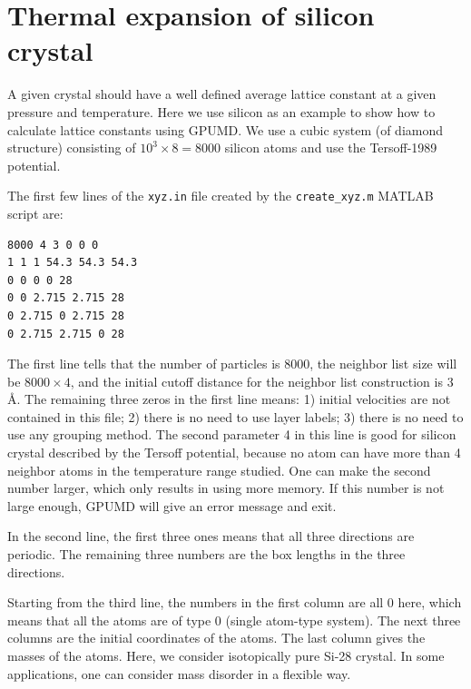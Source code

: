 \documentclass[12pt,a4paper]{report}
\begin{document}
\section{Thermal expansion of silicon crystal}


A given crystal should have a well defined average lattice constant at a given pressure and temperature. Here we use silicon as an example to show how to calculate lattice constants using GPUMD. We use a cubic system (of diamond structure) consisting of $10^3\times 8 = 8000$ silicon atoms and use the Tersoff-1989 potential.

The first few lines of the \verb"xyz.in" file created by the \verb"create_xyz.m" MATLAB script are:
\begin{verbatim}
8000 4 3 0 0 0
1 1 1 54.3 54.3 54.3
0 0 0 0 28
0 0 2.715 2.715 28
0 2.715 0 2.715 28
0 2.715 2.715 0 28
\end{verbatim}
The first line tells that the number of particles is 8000, the neighbor list size will be
$8000\times 4$, and the initial cutoff distance for the neighbor list construction is 3 \AA. The remaining three zeros in the first line means: 1) initial velocities are not contained in this file; 2) there is no need to use layer labels; 3) there is no need to use any grouping method. The second parameter 4 in this line is good for silicon crystal described by the Tersoff potential, because no atom can have more than 4 neighbor atoms in the temperature range studied. One can make the second number larger, which only results in using more memory. If this number is not large enough, GPUMD will give an error message and exit. 

In the second line, the first three ones means that all three directions are periodic. The remaining three numbers are the box lengths in the three directions. 

Starting from the third line, the numbers in the first column are all 0 here, which means that all the atoms are of type 0 (single atom-type system). The next three columns are the initial coordinates of the atoms. The last column gives the masses of the atoms. Here, we consider isotopically pure Si-28 crystal. In some applications, one can consider mass disorder in a flexible way.
\end{document}
